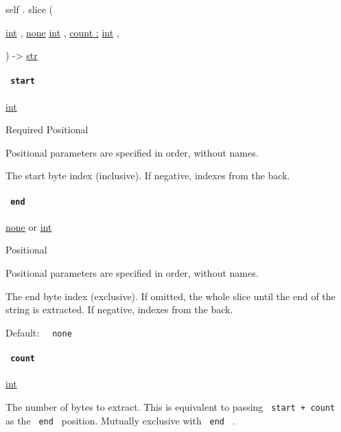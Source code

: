 self { . } { slice } (

{ \href{/docs/reference/foundations/int/}{int} , } {
\href{/docs/reference/foundations/none/}{none}
\href{/docs/reference/foundations/int/}{int} , } {
\hyperref[definitions-slice-parameters-count]{count :}
\href{/docs/reference/foundations/int/}{int} , }

) -\textgreater{} \href{/docs/reference/foundations/str/}{str}

\paragraph{\texorpdfstring{\texttt{\ start\ }}{ start }}\label{definitions-slice-start}

\href{/docs/reference/foundations/int/}{int}

{Required} {{ Positional }}

\label{definitions-slice-start-positional-tooltip}
Positional parameters are specified in order, without names.

The start byte index (inclusive). If negative, indexes from the back.

\paragraph{\texorpdfstring{\texttt{\ end\ }}{ end }}\label{definitions-slice-end}

\href{/docs/reference/foundations/none/}{none} {or}
\href{/docs/reference/foundations/int/}{int}

{{ Positional }}

\label{definitions-slice-end-positional-tooltip}
Positional parameters are specified in order, without names.

The end byte index (exclusive). If omitted, the whole slice until the
end of the string is extracted. If negative, indexes from the back.

Default: \texttt{\ }{\texttt{\ none\ }}\texttt{\ }

\paragraph{\texorpdfstring{\texttt{\ count\ }}{ count }}\label{definitions-slice-count}

\href{/docs/reference/foundations/int/}{int}

The number of bytes to extract. This is equivalent to passing
\texttt{\ start\ +\ count\ } as the \texttt{\ end\ } position. Mutually
exclusive with \texttt{\ end\ } .

